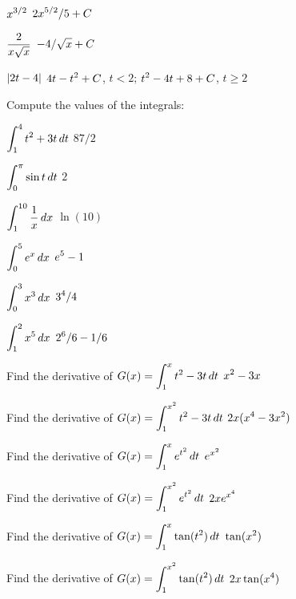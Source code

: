 \exercise $\displaystyle x^{3/2}$
\answer $\displaystyle 2x^{5/2}/5+C$
\endanswer
\endexercise

\exercise $\displaystyle {2\over x\sqrt x}$
\answer $\displaystyle -4/\sqrt{x}+C$
\endanswer
\endexercise

\exercise $\displaystyle |2t-4|$
\answer $\displaystyle 4t-t^2+C$, $t<2$; $\displaystyle t^2-4t+8+C$, $t\ge 2$
\endanswer

\endtwocol

\noindent
Compute the values of the integrals:

\twocol
\endexercise

\exercise $\displaystyle \int_1^4 t^2+3t\,dt$
\answer $87/2$
\endanswer
\endexercise

\exercise $\displaystyle \int_0^\pi \sin t\,dt$
\answer $2$
\endanswer
\endexercise

\iflatetranscendentals
\elselatetranscendentals

\exercise $\displaystyle \int_1^{10} {1\over x}\,dx$
\answer $\ln(10)$
\endanswer
\endexercise

\exercise $\displaystyle \int_0^5 e^x\,dx$
\answer $\displaystyle e^5-1$
\endanswer
\endexercise
\filatetranscendentals

\exercise $\displaystyle \int_0^3 x^3\,dx$
\answer $\displaystyle 3^4/4$
\endanswer
\endexercise

\exercise $\displaystyle \int_1^2 x^5\,dx$
\answer $\displaystyle 2^6/6 -1/6$
\endanswer

\endtwocol

\msk
\endexercise

\exercise Find the derivative of $\displaystyle G(x)=\int_1^x t^2-3t\,dt$
\answer $\displaystyle x^2-3x$
\endanswer
\endexercise

\exercise Find the derivative of $\displaystyle G(x)=\int_1^{x^2} t^2-3t\,dt$
\answer $\displaystyle 2x(x^4-3x^2)$
\endanswer
\endexercise

\iflatetranscendentals
\elselatetranscendentals

\exercise Find the derivative of $\displaystyle G(x)=\int_1^x e^{t^2}\,dt$
\answer $\displaystyle e^{x^2}$
\endanswer
\endexercise

\exercise Find the derivative of $\displaystyle G(x)=\int_1^{x^2} e^{t^2}\,dt$
\answer $\displaystyle 2xe^{x^4}$
\endanswer
\endexercise
\filatetranscendentals

\exercise Find the derivative of $\displaystyle G(x)=\int_1^x \tan(t^2)\,dt$
\answer $\displaystyle \tan(x^2)$
\endanswer
\endexercise

\exercise Find the derivative of $\displaystyle G(x)=\int_1^{x^2} \tan(t^2)\,dt$
\answer $\displaystyle 2x\tan(x^4)$
\endanswer
\endexercise

\endexercises

